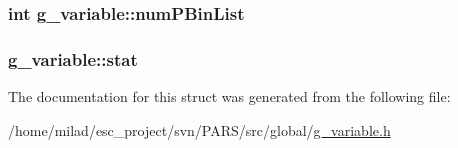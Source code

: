 \label{structg__variable_a59153de8e5186183f6a85ab0ae4e44c0}
\hypertarget{structg__variable_a1b0b5933340788334ca1884e1e63707e}{
\subsubsection[{numPBinList}]{\setlength{\rightskip}{0pt plus 5cm}int {\bf g\_\-variable::numPBinList}}}
\label{structg__variable_a1b0b5933340788334ca1884e1e63707e}
\hypertarget{structg__variable_a548b9947f5c28cff1174da06598b4903}{
\subsubsection[{stat}]{ {\bf g\_\-variable::stat}}}
\label{structg__variable_a548b9947f5c28cff1174da06598b4903}


The documentation for this struct was generated from the following file:\begin{DoxyCompactItemize}
\item 
/home/milad/esc\_\-project/svn/PARS/src/global/\hyperlink{g__variable_8h}{g\_\-variable.h}\end{DoxyCompactItemize}
